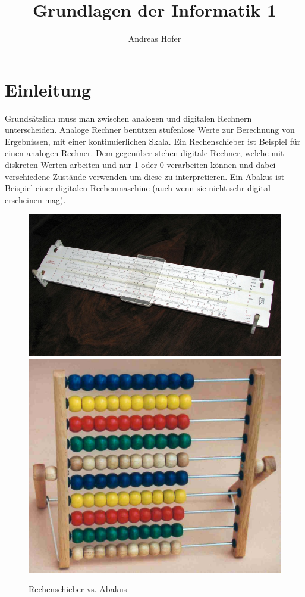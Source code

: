 \documentclass{article}
\title{\vspace{-1cm}Grundlagen der Informatik 1}
\author{Andreas Hofer}
\begin{document}
	\maketitle
	\tableofcontents
	\newpage
	\section{Einleitung}
	Grundsätzlich muss man zwischen analogen und digitalen Rechnern unterscheiden. Analoge Rechner benützen stufenlose Werte zur Berechnung von Ergebnissen, mit einer kontinuierlichen Skala. Ein Rechenschieber ist Beispiel für einen analogen Rechner. Dem gegenüber stehen digitale Rechner, welche mit diskreten Werten arbeiten und nur 1 oder 0 verarbeiten können und dabei verschiedene Zustände verwenden um diese zu interpretieren. Ein Abakus ist Beispiel einer digitalen Rechenmaschine (auch wenn sie nicht sehr digital erscheinen mag).
	\begin{figure}[H]
	\centering
	\includegraphics[scale=0.78]{Bilder/smol_rechenschieber.jpg}
	\includegraphics[scale=0.165]{Bilder/abakus.jpg}
	\caption{Rechenschieber vs. Abakus}
	\end{figure}
\end{document}
